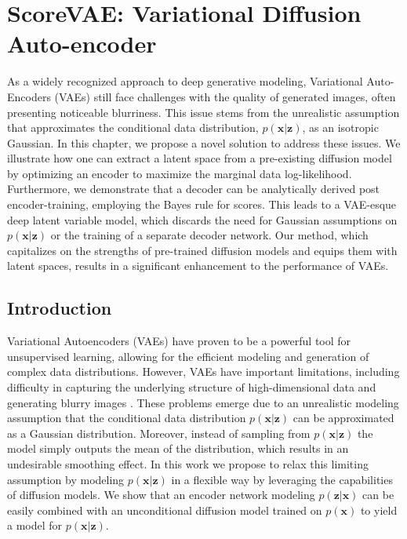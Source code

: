 \chapter{ScoreVAE: Variational Diffusion Auto-encoder}\label{Chapter:ScoreVAE}

\ifpdf
    \graphicspath{{Chapter3/Figs/Raster/}{Chapter3/Figs/PDF/}{Chapter3/Figs/}}
\else
    \graphicspath{{Chapter3/Figs/Vector/}{Chapter3/Figs/}}
\fi

As a widely recognized approach to deep generative modeling, Variational Auto-Encoders (VAEs) still face challenges with the quality of generated images, often presenting noticeable blurriness. This issue stems from the unrealistic assumption that approximates the conditional data distribution, $p(\textbf{x} | \textbf{z})$, as an isotropic Gaussian. In this chapter, we propose a novel solution to address these issues. We illustrate how one can extract a latent space from a pre-existing diffusion model by optimizing an encoder to maximize the marginal data log-likelihood. Furthermore, we demonstrate that a decoder can be analytically derived post encoder-training, employing the Bayes rule for scores. This leads to a VAE-esque deep latent variable model, which discards the need for Gaussian assumptions on $p(\textbf{x} | \textbf{z})$ or the training of a separate decoder network. Our method, which capitalizes on the strengths of pre-trained diffusion models and equips them with latent spaces, results in a significant enhancement to the performance of VAEs.

\section{Introduction}
Variational Autoencoders (VAEs) \cite{vae} have proven to be a powerful tool for unsupervised learning, allowing for the efficient modeling and generation of complex data distributions. However, VAEs have important limitations, including difficulty in capturing the underlying structure of high-dimensional data and generating blurry images \cite{zaho2017understanding_vaes}. These problems emerge due to an unrealistic modeling assumption that the conditional data distribution $p(\textbf{x}| \textbf{z})$ can be approximated as a Gaussian distribution. Moreover, instead of sampling from $p(\textbf{x}| \textbf{z})$ the model simply outputs the mean of the distribution, which results in an undesirable smoothing effect. In this work we propose to relax this limiting assumption by modeling $p(\textbf{x}| \textbf{z})$ in a flexible way by leveraging the capabilities of diffusion models. We show that an encoder network modeling $p( \textbf{z} | \textbf{x})$ can be easily combined with an unconditional diffusion model trained on $p(\textbf{x})$ to yield a model for $p(\textbf{x} | \textbf{z})$.

